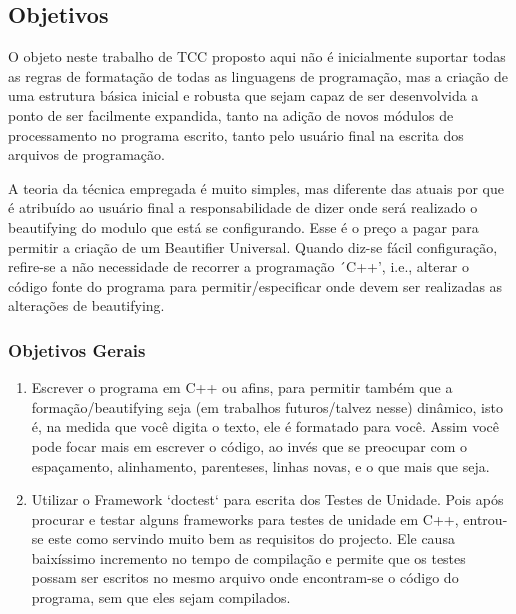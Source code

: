 \begin{englishtext}
\begin{enumerate}[leftmargin=*]
    \end{enumerate}



\subsection{Objetivos}

    O objeto neste trabalho de TCC proposto aqui não é inicialmente suportar todas as regras de
    formatação de todas as linguagens de programação, mas a criação de uma estrutura básica inicial
    e robusta que sejam capaz de ser desenvolvida a ponto de ser facilmente expandida, tanto na
    adição de novos módulos de processamento no programa escrito, tanto pelo usuário final na
    escrita dos arquivos de programação.

    A teoria da técnica empregada é muito simples, mas diferente das atuais por que é atribuído ao
    usuário final a responsabilidade de dizer onde será realizado o beautifying do modulo que está
    se configurando. Esse é o preço a pagar para permitir a criação de um Beautifier Universal.
    Quando diz-se fácil configuração, refire-se a não necessidade de recorrer a programação ´C++',
    i.e., alterar o código fonte do programa para permitir/especificar onde devem ser realizadas as
    alterações de beautifying.


\subsubsection{Objetivos Gerais}

    \begin{enumerate}[leftmargin=*]

        \item

        Escrever o programa em C++ ou afins, para permitir também que a formação/beautifying seja
        (em trabalhos futuros/talvez nesse) dinâmico, isto é, na medida que você digita o texto, ele
        é formatado para você. Assim você pode focar mais em escrever o código, ao invés que se
        preocupar com o espaçamento, alinhamento, parenteses, linhas novas, e o que mais que seja.

        \item

        Utilizar o Framework `doctest` para escrita dos Testes de Unidade. Pois após procurar e
        testar alguns frameworks para testes de unidade em C++, entrou-se este como servindo muito
        bem as requisitos do projecto. Ele causa baixíssimo incremento no tempo de compilação e
        permite que os testes possam ser escritos no mesmo arquivo onde encontram-se o código do
        programa, sem que eles sejam compilados.


\end{enumerate}
\end{englishtext}
